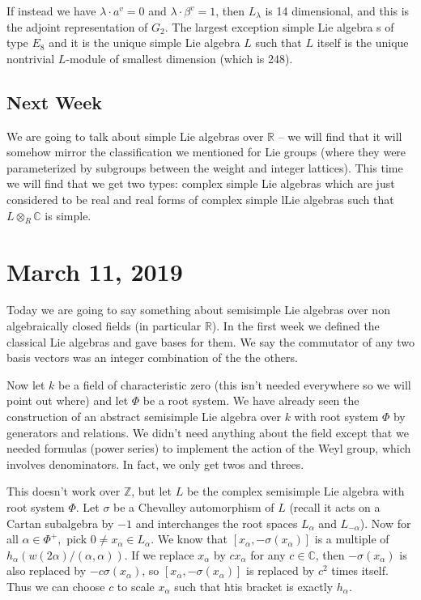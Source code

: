 \documentclass[12pt]{article}
\theoremstyle{nonumberbreak}
\theoremstyle{changebreak}
\theoremstyle{nonumberbreak}
\theoremstyle{change}
\newcommand*{\Z}{
\mathbb{Z}
}
\newcommand*{\R}{
\mathbb{R}
}
\newcommand*{\C}{
\mathbb{C}
}
\begin{document}
If instead we have $\lambda\cdot a^v=0$ and $\lambda\cdot \beta^v=1$, then $L_\lambda$ is 
14 dimensional, and this is the adjoint representation of $G_2$. The largest exception simple Lie algebra s of type $E_8$
and it is the unique simple Lie algebra $L$ such that $L$ itself is the unique nontrivial $L$-module of smallest dimension (which is 248).

\subsection{Next Week}
We are going to talk about simple Lie algebras over $\R$ -- we will find that it will somehow 
mirror the classification we mentioned for Lie groups (where they were parameterized by subgroups between the weight
and integer lattices). This time we will find that we get two types: complex simple Lie algebras which are just 
considered to be real and real forms of complex simple lLie algebras such that $L\otimes_R\C$ is simple.

\section{March 11, 2019}
Today we are going to say something about semisimple Lie algebras over non algebraically closed fields (in particular $\R$).
In the first week we defined the classical Lie algebras and gave bases for them. We say the commutator of any two basis vectors was an 
integer combination of the the others. 

Now let $k$ be a field of characteristic zero (this isn't needed everywhere so we will point out where) and let $\Phi$
be a root system. We have already seen the construction of an abstract semisimple Lie algebra over $k$ with root system $\Phi$
by generators and relations. We didn't need anything about the field except that we needed formulas (power series)
to implement the action of the Weyl group, which involves denominators. In fact, we only get twos and threes.

This doesn't work over $\Z$, but let $L$ be the complex semisimple Lie algebra with root system $\Phi$. Let $\sigma$ be a
Chevalley automorphism of $L$ (recall it acts on a Cartan subalgebra by $-1$ and interchanges the root spaces $L_{\alpha}$ and $L_{-\alpha}$).
Now for all $\alpha\in\Phi^+,$ pick $0\ne x_\alpha\in L_\alpha$. We know that $[x_\alpha,-\sigma(x_\alpha)]$ is a multiple
of $h_\alpha(w(2\alpha)/(\alpha,\alpha))$. If we replace $x_\alpha$ by $cx_\alpha$ for any $c\in\C$,
then $-\sigma(x_\alpha)$ is also replaced by $-c\sigma(x_\alpha)$, so $[x_\alpha,-\sigma(x_\alpha)]$ is replaced by $c^2$
times itself. Thus we can choose $c$ to scale $x_\alpha$ such that htis bracket is exactly $h_\alpha$.
\end{document}
